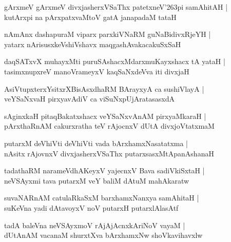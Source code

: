 \begin{shloka}
gArxmeV gArxmeV divxjasherxVSaThx patetxneV\char'263pi samAhitAH |\\
kutArxpi na pArxpatxvaMtoV gatA janapadaM tataH
\end{shloka}

\begin{shloka}
nAmAnx dashapuraM viparx parxkiVNaRM guNaBidivxRjeYH |\\
yatarx nArisusxkeVshiVshavx maqgashAvakacakuSxSaH
\end{shloka}

\begin{shloka}
daqSATxvX muhayxMti puruSAshacxMdarxmuKayxshacx tA yataH |\\
tasimxnupxreV manoVrameyxV kaqSaNxdeVva iti divxjaH
\end{shloka}

\begin{shloka}
AsiVtupxterxYsitxrXBisAsxdhaRM BArayxyA ca sushiVlayA |\\
veYSaNxvaH pirxyavAdiV ca viSuNxpUjAratasasxdA
\end{shloka}

\begin{shloka}
sAginxkaH pitaqBakatxshacx veYSaNxvAnAM pirxyaMkaraH |\\
pArxthaRnAM cakurxratha teV rAjocnxV dUtA divxjoVtatxmaM
\end{shloka}

\begin{shloka}
putarxM deVhiVti deVhiVti vada bArxhamxNasatatxma |\\
nAsitx rAjovnxV divxjasherxVSaThx putarxsasxMtApanAshanaH
\end{shloka}

\begin{shloka}
tadathaRM narameVdhAKeyxV yajecnxV Bava sadiVkiSxtaH |\\
neVSAyxmi tava putarxM veY baliM dAtuM mahAkaratw
\end{shloka}

\begin{shloka}
suvaNARnAM catulaRkaSxM barxhamxNanxya samAhitaH |\\
suKeVna yadi dAtavoyxV noV putarxH putarxlAlasAtf
\end{shloka}

\begin{shloka}
tadA baleVna neVSAyxmoV rAjAjAcnxkAriNoV vayaM |\\
dUtAnAM vacanaM shurxtXva bArxhamxNw shoVkavihavxlw
\end{shloka}

